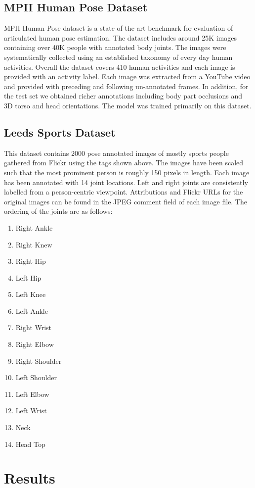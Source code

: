 \documentclass{fisatprojectfinal}
\begin{document}
\section{MPII Human Pose Dataset}
MPII Human Pose dataset is a state of the art benchmark for evaluation of articulated human pose estimation. The dataset includes around 25K images containing over 40K people with annotated body joints. The images were systematically collected using an established taxonomy of every day human activities. Overall the dataset covers 410 human activities and each image is provided with an activity label. Each image was extracted from a YouTube video and provided with preceding and following un-annotated frames. In addition, for the test set we obtained richer annotations including body part occlusions and 3D torso and head orientations.
The model was trained primarily on this dataset.

\section{Leeds Sports Dataset}
This dataset contains 2000 pose annotated images of mostly sports people gathered from Flickr using the tags shown above. The images have been scaled such that the most prominent person is roughly 150 pixels in length. Each image has been annotated with 14 joint locations. Left and right joints are consistently labelled from a person-centric viewpoint. Attributions and Flickr URLs for the original images can be found in the JPEG comment field of each image file. 
The ordering of the joints are as follows:
\begin{enumerate}
	\item Right Ankle
	\item Right Knew
	\item Right Hip
	\item Left Hip
	\item Left Knee
	\item Left Ankle
	\item Right Wrist
	\item Right Elbow
	\item Right Shoulder
	\item Left Shoulder
	\item Left Elbow
	\item Left Wrist
	\item Neck
	\item Head Top
\end{enumerate}
\chapter{Results}
\end{document}
